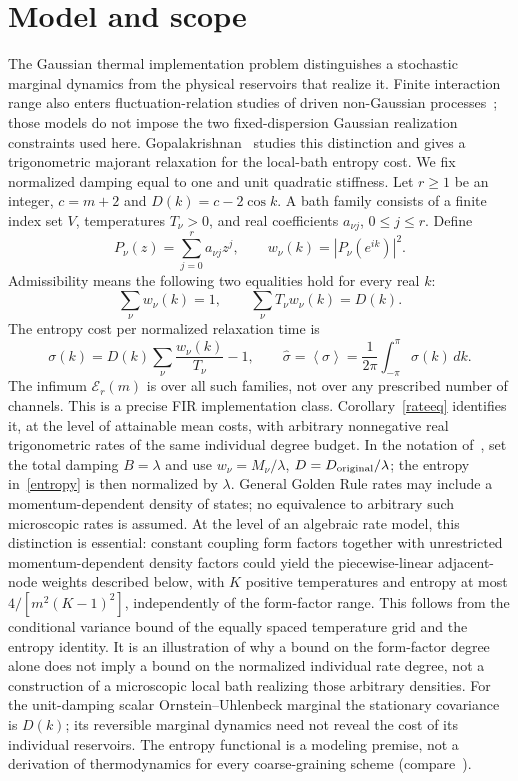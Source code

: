 \documentclass[11pt]{article}
\newcommand{\avg}[1]{\left\langle #1\right\rangle}
\newcommand{\opt}{\mathcal E_r(m)}
\begin{document}
\section{Model and scope}
The Gaussian thermal implementation problem distinguishes a stochastic marginal dynamics from the physical reservoirs that realize it. Finite interaction range also enters fluctuation-relation studies of driven non-Gaussian processes~\cite{faria}; those models do not impose the two fixed-dispersion Gaussian realization constraints used here. Gopalakrishnan~\cite{gopal} studies this distinction and gives a trigonometric majorant relaxation for the local-bath entropy cost. We fix normalized damping equal to one and unit quadratic stiffness. Let $r\ge1$ be an integer, $c=m+2$ and $D(k)=c-2\cos k$. A bath family consists of a finite index set $V$, temperatures $T_\nu>0$, and real coefficients $a_{\nu j}$, $0\le j\le r$. Define
\begin{equation}
P_\nu(z)=\sum_{j=0}^r a_{\nu j}z^j,\qquad w_\nu(k)=|P_\nu(e^{ik})|^2.
\end{equation}
Admissibility means the following two equalities hold for every real $k$:
\begin{equation}\label{constraints}
\sum_\nu w_\nu(k)=1,\qquad \sum_\nu T_\nu w_\nu(k)=D(k).
\end{equation}
The entropy cost per normalized relaxation time is
\begin{equation}\label{entropy}
\sigma(k)=D(k)\sum_\nu \frac{w_\nu(k)}{T_\nu}-1,
\qquad \hat\sigma=\avg{\sigma}=\frac1{2\pi}\int_{-\pi}^{\pi}\sigma(k)\,dk.
\end{equation}
The infimum $\opt$ is over all such families, not over any prescribed number of channels. This is a precise FIR implementation class. Corollary~\ref{rateeq} identifies it, at the level of attainable mean costs, with arbitrary nonnegative real trigonometric rates of the same individual degree budget. In the notation of~\cite[Eq.~(10)]{gopal}, set the total damping $B=\lambda$ and use $w_\nu=M_\nu/\lambda$, $D=D_{\rm original}/\lambda$; the entropy in~\eqref{entropy} is then normalized by $\lambda$. General Golden Rule rates may include a momentum-dependent density of states; no equivalence to arbitrary such microscopic rates is assumed. At the level of an algebraic rate model, this distinction is essential: constant coupling form factors together with unrestricted momentum-dependent density factors could yield the piecewise-linear adjacent-node weights described below, with $K$ positive temperatures and entropy at most $4/[m^2(K-1)^2]$, independently of the form-factor range. This follows from the conditional variance bound of the equally spaced temperature grid and the entropy identity. It is an illustration of why a bound on the form-factor degree alone does not imply a bound on the normalized individual rate degree, not a construction of a microscopic local bath realizing those arbitrary densities. For the unit-damping scalar Ornstein--Uhlenbeck marginal the stationary covariance is $D(k)$; its reversible marginal dynamics need not reveal the cost of its individual reservoirs. The entropy functional is a modeling premise, not a derivation of thermodynamics for every coarse-graining scheme (compare~\cite{murashita,esposito}).
\end{document}
